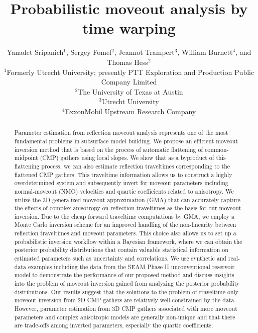 
\title{Probabilistic moveout analysis by time warping}

\author{Yanadet Sripanich$^1$, Sergey Fomel$^2$, Jeannot Trampert$^3$, William Burnett$^4$, and Thomas Hess$^2$ \\
$^1$Formerly Utrecht University; presently PTT Exploration and Production Public Company Limited  \\
$^2$The University of Texas at Austin \\
$^3$Utrecht University \\
$^4$ExxonMobil Upstream Research Company
}

\maketitle


\begin{abstract}
Parameter estimation from reflection moveout analysis represents one of the most fundamental problems in subsurface model building. We propose an efficient moveout inversion method that is based on the process of automatic flattening of common-midpoint (CMP) gathers using local slopes. We show that as a byproduct of this flattening process, we can also estimate reflection traveltimes corresponding to the flattened CMP gathers. This traveltime information allows us to construct a highly overdetermined system and subsequently invert for moveout parameters including normal-moveout (NMO) velocities and quartic coefficients related to anisotropy. We utilize the 3D generalized moveout approximation (GMA) that can accurately capture the effects of complex anisotropy on reflection traveltimes as the basis for our moveout inversion. Due to the cheap forward traveltime computations by GMA, we employ a Monte Carlo inversion scheme for an improved handling of the non-linearity between reflection traveltimes and moveout parameters. This choice also allows us to set up a probabilistic inversion workflow within a Bayesian framework, where we can obtain the posterior probability distributions that contain valuable statistical information on estimated parameters such as uncertainty and correlations. We use synthetic and real-data examples including the data from the SEAM Phase II unconventional reservoir model to demonstrate the performance of our proposed method and discuss insights into the problem of moveout inversion gained from analyzing the posterior probability distributions. Our results suggest that the solutions to the problem of traveltime-only moveout inversion from 2D CMP gathers are relatively well-constrained by the data. However, parameter estimation from 3D CMP gathers associated with more moveout parameters and complex anisotropic models are generally non-unique and that there are trade-offs among inverted parameters, especially the quartic coefficients.
\end{abstract}


